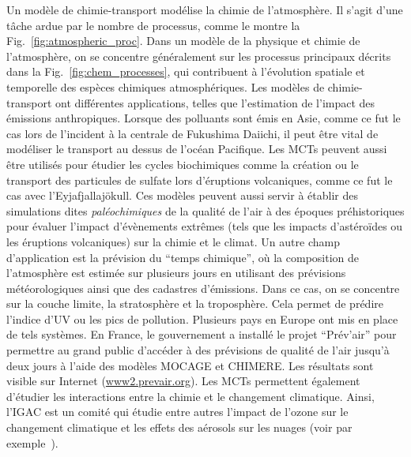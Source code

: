 Un modèle de chimie-transport modélise la chimie de l'atmosphère. Il s'agit
d'une tâche ardue par le nombre de processus, comme le montre la
Fig.~\ref{fig:atmospheric_proc}. Dans un modèle de la physique et chimie de
l'atmosphère, on se concentre généralement sur les processus principaux décrits
dans la Fig.~\ref{fig:chem_processes}, qui contribuent à l'évolution spatiale et
temporelle des espèces chimiques atmosphériques. Les modèles de chimie-transport
ont différentes applications, telles que l'estimation de l'impact des émissions
anthropiques. Lorsque des polluants sont émis en Asie, comme ce fut le cas
lors de l'incident à la centrale de Fukushima Daiichi, il peut être vital de
modéliser le transport au dessus de l'océan Pacifique. Les MCTs peuvent aussi
être utilisés pour étudier les cycles biochimiques comme la création ou le
transport des particules de sulfate lors d'éruptions volcaniques, comme ce fut
le cas avec l'Eyjafjallaj\"okull. Ces modèles peuvent aussi servir à établir des
simulations dites \textit{paléochimiques} de la qualité de l'air à des époques
préhistoriques pour évaluer l'impact d'évènements extrêmes (tels que les impacts
d'astéroïdes ou les éruptions volcaniques) sur la chimie et le climat. Un autre
champ d'application est la prévision du \enquote{temps chimique}, où la composition de
l'atmosphère est estimée sur plusieurs jours en utilisant des prévisions
météorologiques ainsi que des cadastres d'émissions. Dans ce cas, on se
concentre sur la couche limite, la stratosphère et la troposphère. Cela permet
de prédire l'indice d'UV ou les pics de pollution. Plusieurs pays en Europe ont
mis en place de tels systèmes. En France, le gouvernement a installé le projet
\enquote{Prév'air} pour permettre au grand public d'accéder à des prévisions de qualité
de l'air jusqu'à deux jours à l'aide des modèles MOCAGE et CHIMERE\@. Les
résultats sont visible sur Internet (\url{www2.prevair.org}). Les MCTs
permettent également d'étudier les interactions entre la chimie et le changement
climatique. Ainsi, l'IGAC est un comité qui étudie entre autres l'impact de
l'ozone sur le changement climatique et les effets des aérosols sur les nuages
(voir par exemple~\cite{IGAC2006}).


